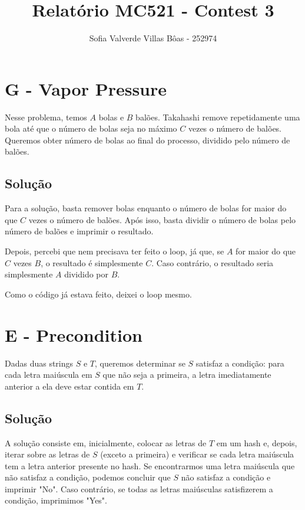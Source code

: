 \documentclass[12pt,a4paper]{article}
\title{Relatório MC521 - Contest 3}
\author{Sofia Valverde Villas Bôas - 252974}
\begin{document}
\maketitle

\section*{G - Vapor Pressure}

Nesse problema, temos $A$ bolas e $B$ balões. Takahashi
remove repetidamente uma bola até que o número de
bolas seja no máximo $C$ vezes o número de balões. Queremos obter 
número de bolas ao final do processo, dividido pelo número de balões.

\subsection*{Solução}

Para a solução, basta remover bolas enquanto o número de bolas for maior
do que $C$ vezes o número de balões. Após isso, basta dividir o número de bolas
pelo número de balões e imprimir o resultado.

Depois, percebi que nem precisava ter feito o loop, já que, 
se $A$ for maior do que $C$ vezes $B$, o resultado é simplesmente $C$.
Caso contrário, o resultado seria simplesmente $A$ dividido por $B$.

Como o código já estava feito, deixei o loop mesmo.

\section*{E - Precondition }

Dadas duas strings $S$ e $T$, queremos determinar se $S$
satisfaz a condição: para cada letra maiúscula em $S$
que não seja a primeira, a letra imediatamente anterior a ela deve estar contida em $T$.

\subsection*{Solução}

A solução consiste em, inicialmente, colocar as letras de $T$ em um hash e,
depois, iterar sobre as letras de $S$ (exceto a primeira) e verificar se cada letra maiúscula
tem a letra anterior presente no hash.
Se encontrarmos uma letra maiúscula que não satisfaz a condição, podemos concluir que $S$ não satisfaz a condição
e imprimir "No". Caso contrário, se todas as letras maiúsculas satisfizerem a condição, imprimimos "Yes".
\end{document}
